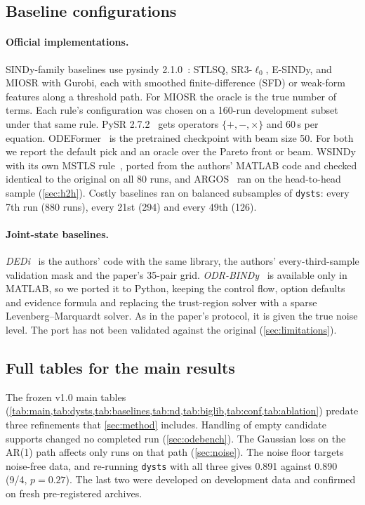 \subsection{Baseline configurations}
\label{app:baselines}
\paragraph{Official implementations.} SINDy-family baselines use pysindy 2.1.0~\citep{desilva2020pysindy,kaptanoglu2022pysindy}: STLSQ, SR3-$\ell_0$, E-SINDy, and MIOSR with Gurobi, each with smoothed finite-difference (SFD) or weak-form features along a threshold path. For MIOSR the oracle is the true number of terms. Each rule's configuration was chosen on a 160-run development subset under that same rule. PySR 2.7.2~\citep{cranmer2023pysr} gets operators $\{+,-,\times\}$ and 60\,s per equation. ODEFormer~\citep{dascoli2024odeformer} is the pretrained checkpoint with beam size 50. For both we report the default pick and an oracle over the Pareto front or beam. WSINDy with its own MSTLS rule~\citep{messenger2021wsindy}, ported from the authors' MATLAB code and checked identical to the original on all 80 runs, and ARGOS~\citep{egan2024argos} ran on the head-to-head sample (\cref{sec:h2h}). Costly baselines ran on balanced subsamples of \texttt{dysts}: every 7th run (880 runs), every 21st (294) and every 49th (126).

\paragraph{Joint-state baselines.} \emph{DEDi}~\citep{meissner2024dedi} is the authors' code with the same library, the authors' every-third-sample validation mask and the paper's 35-pair grid. \emph{ODR-BINDy}~\citep{fung2025odrbindy} is available only in MATLAB, so we ported it to Python, keeping the control flow, option defaults and evidence formula and replacing the trust-region solver with a sparse Levenberg--Marquardt solver. As in the paper's protocol, it is given the true noise level. The port has not been validated against the original (\cref{sec:limitations}).

\subsection{Full tables for the main results}
\label{app:tables}

The frozen v1.0 main tables (\cref{tab:main,tab:dysts,tab:baselines,tab:nd,tab:biglib,tab:conf,tab:ablation}) predate three refinements that \cref{sec:method} includes. Handling of empty candidate supports changed no completed run (\cref{sec:odebench}). The Gaussian loss on the AR(1) path affects only runs on that path (\cref{sec:noise}). The noise floor targets noise-free data, and re-running \texttt{dysts} with all three gives 0.891 against 0.890 (9/4, $p=0.27$). The last two were developed on development data and confirmed on fresh pre-registered archives.

